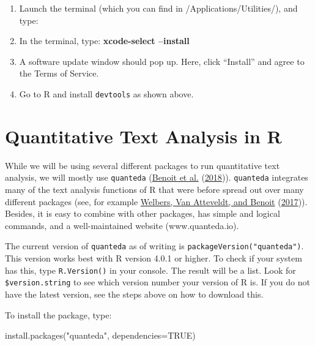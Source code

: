 \documentclass[
]{book}
\newenvironment{Shaded}{\begin{snugshade}}{\end{snugshade}}
\newcommand{\AttributeTok}[1]{\textcolor[rgb]{0.77,0.63,0.00}{#1}}
\newcommand{\ConstantTok}[1]{\textcolor[rgb]{0.00,0.00,0.00}{#1}}
\newcommand{\FunctionTok}[1]{\textcolor[rgb]{0.00,0.00,0.00}{#1}}
\newcommand{\NormalTok}[1]{#1}
\newcommand{\StringTok}[1]{\textcolor[rgb]{0.31,0.60,0.02}{#1}}
\providecommand{\tightlist}{%
  \setlength{\itemsep}{0pt}\setlength{\parskip}{0pt}}
\begin{document}
\begin{enumerate}
\def\labelenumi{\arabic{enumi}.}
\tightlist
\item
  Launch the terminal (which you can find in /Applications/Utilities/), and type:
\item
  In the terminal, type: \textbf{xcode-select --install}
\item
  A software update window should pop up. Here, click ``Install'' and agree to the Terms of Service.
\item
  Go to R and install \texttt{devtools} as shown above.
\end{enumerate}

\hypertarget{quantitative-text-analysis-in-r}{%
\section{Quantitative Text Analysis in R}\label{quantitative-text-analysis-in-r}}

While we will be using several different packages to run quantitative text analysis, we will mostly use \texttt{quanteda} (\protect\hyperlink{ref-Benoit2018}{Benoit et al.} (\protect\hyperlink{ref-Benoit2018}{2018})). \texttt{quanteda} integrates many of the text analysis functions of R that were before spread out over many different packages (see, for example \protect\hyperlink{ref-Welbers2017}{Welbers, Van Atteveldt, and Benoit} (\protect\hyperlink{ref-Welbers2017}{2017})). Besides, it is easy to combine with other packages, has simple and logical commands, and a well-maintained website (www.quanteda.io).

The current version of \texttt{quanteda} as of writing is \texttt{packageVersion("quanteda")}. This version works best with R version 4.0.1 or higher. To check if your system has this, type \texttt{R.Version()} in your console. The result will be a list. Look for \texttt{\$version.string} to see which version number your version of R is. If you do not have the latest version, see the steps above on how to download this.

To install the package, type:

\begin{Shaded}
\begin{Highlighting}[]
\FunctionTok{install.packages}\NormalTok{(}\StringTok{"quanteda"}\NormalTok{, }\AttributeTok{dependencies=}\ConstantTok{TRUE}\NormalTok{)}
\end{Highlighting}
\end{Shaded}
\end{document}
